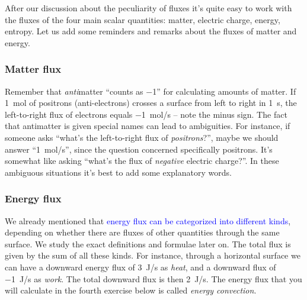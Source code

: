 \documentclass[a4paper,12pt,%
onecolumn,oneside,%
british%
]{memoir}
\renewcommand*{\|}[1][]{\nonscript\:#1\vert\nonscript\:\mathopen{}}
\newcommand*{\sect}{\S}%
\renewcommand*{\autoref}[2]{\sidepar{\vspace{-1ex}\footnotesize{\color{blue}\faIcon{%
angle-right%
}\enspace\sect\,\ref{#1} page\,\pageref{#1}}}\textcolor{blue}{#2}}
\begin{document}
\bigskip

After our discussion about the peculiarity of fluxes it's quite easy to work with the fluxes of the four main scalar quantities: matter, electric charge, energy, entropy. Let us add some reminders and remarks about the fluxes of matter and energy.


\subsubsection{Matter flux}
\label{sec:matter_flux}

Remember that \emph{anti}matter \enquote{counts as \num{-1}} for calculating amounts of matter. If \qty{1}{mol} of positrons (anti-electrons) crosses a surface from left to right in \qty{1}{s}, the left-to-right flux of electrons equals \qty{-1}{mol/s} -- note the minus sign. The fact that antimatter is given special names can lead to ambiguities. For instance, if someone asks \enquote{what's the left-to-right flux of \emph{positrons}?}, maybe we should answer \enquote{\qty{1}{mol/s}}, since the question concerned specifically positrons. It's somewhat like asking \enquote{what's the flux of \emph{negative} electric charge?}. In these ambiguous situations it's best to add some explanatory words.

\subsubsection{Energy flux}
\label{sec:energy_flux}
We already mentioned that \autoref{sec:forms_energy}{energy flux can be categorized into different kinds}, depending on whether there are fluxes of other quantities through the same surface. We study the exact definitions and formulae later on. The total flux is given by the sum of all these kinds. For instance, through a horizontal surface we can have a downward energy flux of \qty{3}{J/s} as \emph{heat}, and a downward flux of \qty{-1}{J/s} as \emph{work}. The total downward flux is then \qty{2}{J/s}. The energy flux that you will calculate in the fourth exercise below is called \emph{energy convection}.
\end{document}
